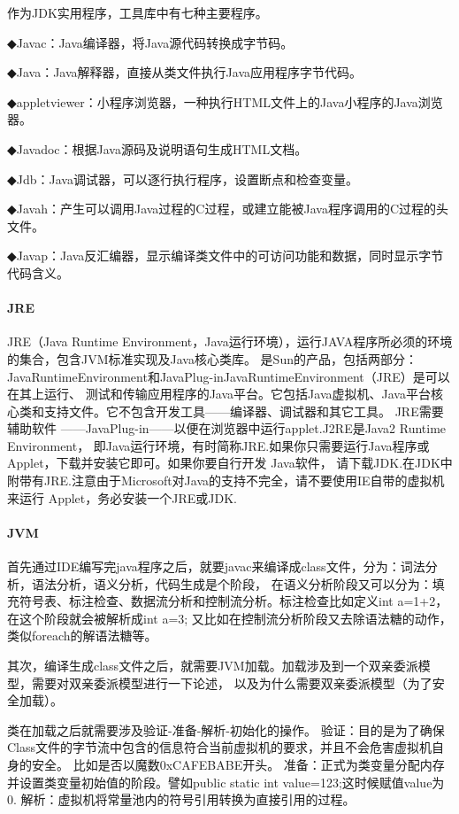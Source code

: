 \documentclass{book}
\begin{document}
作为JDK实用程序，工具库中有七种主要程序。

◆Javac：Java编译器，将Java源代码转换成字节码。

◆Java：Java解释器，直接从类文件执行Java应用程序字节代码。

◆appletviewer：小程序浏览器，一种执行HTML文件上的Java小程序的Java浏览器。

◆Javadoc：根据Java源码及说明语句生成HTML文档。

◆Jdb：Java调试器，可以逐行执行程序，设置断点和检查变量。

◆Javah：产生可以调用Java过程的C过程，或建立能被Java程序调用的C过程的头文件。

◆Javap：Java反汇编器，显示编译类文件中的可访问功能和数据，同时显示字节代码含义。

\paragraph{JRE}
JRE（Java Runtime Environment，Java运行环境），运行JAVA程序所必须的环境的集合，包含JVM标准实现及Java核心类库。
是Sun的产品，包括两部分：JavaRuntimeEnvironment和JavaPlug-inJavaRuntimeEnvironment（JRE）是可以在其上运行、
测试和传输应用程序的Java平台。它包括Java虚拟机、Java平台核心类和支持文件。它不包含开发工具——编译器、调试器和其它工具。
JRE需要辅助软件 ——JavaPlug-in——以便在浏览器中运行applet.J2RE是Java2 Runtime Environment，
即Java运行环境，有时简称JRE.如果你只需要运行Java程序或Applet，下载并安装它即可。如果你要自行开发 Java软件，
请下载JDK.在JDK中附带有JRE.注意由于Microsoft对Java的支持不完全，请不要使用IE自带的虚拟机来运行 Applet，务必安装一个JRE或JDK.

\paragraph{JVM}
首先通过IDE编写完java程序之后，就要javac来编译成class文件，分为：词法分析，语法分析，语义分析，代码生成是个阶段，
在语义分析阶段又可以分为：填充符号表、标注检查、数据流分析和控制流分析。标注检查比如定义int a=1+2，
在这个阶段就会被解析成int a=3; 又比如在控制流分析阶段又去除语法糖的动作，类似foreach的解语法糖等。

其次，编译生成class文件之后，就需要JVM加载。加载涉及到一个双亲委派模型，需要对双亲委派模型进行一下论述，
以及为什么需要双亲委派模型（为了安全加载）。

类在加载之后就需要涉及验证-准备-解析-初始化的操作。
验证：目的是为了确保Class文件的字节流中包含的信息符合当前虚拟机的要求，并且不会危害虚拟机自身的安全。
比如是否以魔数0xCAFEBABE开头。
准备：正式为类变量分配内存并设置类变量初始值的阶段。譬如public static int value=123;这时候赋值value为0.
解析：虚拟机将常量池内的符号引用转换为直接引用的过程。
\end{document}
